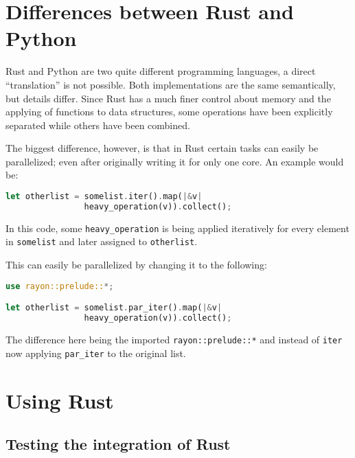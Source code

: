 



\newpage
\section{Differences between Rust and Python}\label{sec:differences}

Rust and Python are two quite different programming languages, a direct
``translation'' is not possible. Both implementations are the same semantically,
but details differ. Since Rust has a much finer control about memory and the
applying of functions to data structures, some operations have been explicitly
separated while others have been combined.

The biggest difference, however, is that in Rust certain tasks can easily be
parallelized; even after originally writing it for only one core. An example
would be:

\vline
\begin{lstlisting}[language=Rust]
let otherlist = somelist.iter().map(|&v|
                heavy_operation(v)).collect();
\end{lstlisting}
\vline

In this code, some \verb|heavy_operation| is being applied iteratively for every element in \verb|somelist| and later assigned to \verb|otherlist|.

This can easily be parallelized by changing it to the following:

\vline
\begin{lstlisting}[language=Rust]
use rayon::prelude::*;

let otherlist = somelist.par_iter().map(|&v|
                heavy_operation(v)).collect();
\end{lstlisting}
\vline

The difference here being the imported \verb|rayon::prelude::*| and instead of
\verb|iter| now applying \verb|par_iter| to the original list.





\newpage
\section{Using Rust}\label{sec:rust}


\subsection{Testing the integration of Rust}\label{sec:integration}

